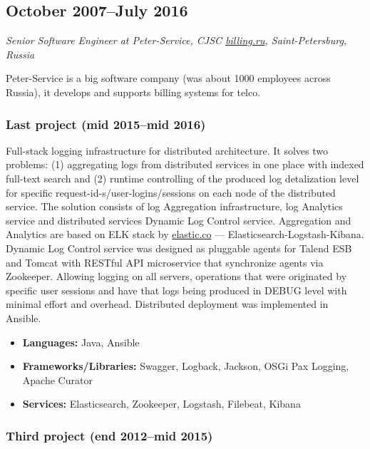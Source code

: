 \subsection*{October 2007--July 2016}

\textit{Senior Software Engineer at Peter-Service, CJSC
\href{https://billing.ru}{\url{billing.ru}}, Saint-Petersburg, Russia}

Peter-Service is a big software company (was about 1000 employees
across Russia), it develops and supports billing systems for telco.

\subsubsection*{Last project (mid 2015--mid 2016)}

Full-stack logging infrastructure for distributed architecture. It
solves two problems: (1) aggregating logs from distributed services in
one place with indexed full-text search and (2) runtime controlling of
the produced log detalization level for specific
request-id-s/user-logins/sessions on each node of the distributed
service. The solution consists of log Aggregation infrastructure, log
Analytics service and distributed services Dynamic Log Control
service. Aggregation and Analytics are based on ELK stack by
\href{https://elastic.co}{\url{elastic.co}} ---
Elasticsearch-Logstash-Kibana. Dynamic Log Control service was
designed as pluggable agents for Talend ESB and Tomcat with RESTful
API microservice that synchronize agents via Zookeeper. Allowing
logging on all servers, operations that were originated by specific
user sessions and have that logs being produced in DEBUG level with
minimal effort and overhead. Distributed deployment was implemented in
Ansible.

\begin{itemize}[noitemsep, nosep]
  \item \textbf{Languages:} Java, Ansible
  \item \textbf{Frameworks/Libraries:} Swagger, Logback, Jackson, OSGi
Pax Logging, Apache Curator
  \item \textbf{Services:} Elasticsearch, Zookeeper, Logstash,
Filebeat, Kibana
\end{itemize}

\subsubsection*{Third project (end 2012--mid 2015)}

